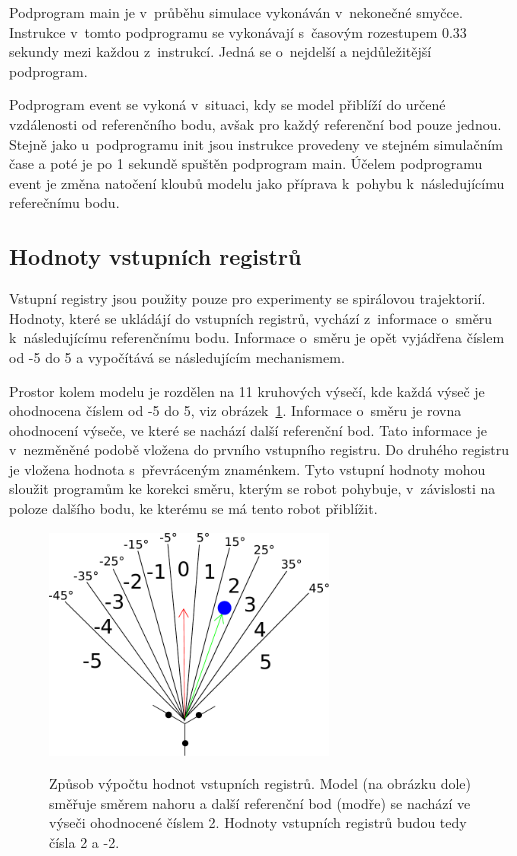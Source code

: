 Podprogram main je v~průběhu simulace vykonáván v~nekonečné smyčce.
Instrukce v~tomto podprogramu se vykonávají s~časovým rozestupem 0.33 sekundy mezi každou z~instrukcí.
Jedná se o~nejdelší a nejdůležitější podprogram.

Podprogram event se vykoná v~situaci, kdy se model přiblíží do určené vzdálenosti od referenčního bodu, avšak pro každý referenční bod pouze jednou.
Stejně jako u~podprogramu init jsou instrukce provedeny ve stejném simulačním čase a poté je po 1 sekundě spuštěn podprogram main.
Účelem podprogramu event je změna natočení kloubů modelu jako příprava k~pohybu k~následujícímu referečnímu bodu.

\subsection{Hodnoty vstupních registrů}
Vstupní registry jsou použity pouze pro experimenty se spirálovou trajektorií.
Hodnoty, které se ukládájí do vstupních registrů, vychází z~informace o~směru k~následujícímu referenčnímu bodu.
Informace o~směru je opět vyjádřena číslem od -5 do 5 a vypočítává se následujícím mechanismem.

Prostor kolem modelu je rozdělen na 11 kruhových výsečí, kde každá výseč je ohodnocena číslem od -5 do 5, viz obrázek~\ref{fig:kruhove_vysece}.
Informace o~směru je rovna ohodnocení výseče, ve které se nachází další referenční bod.
Tato informace je v~nezměněné podobě vložena do prvního vstupního registru.
Do druhého registru je vložena hodnota s~převráceným znaménkem.
Tyto vstupní hodnoty mohou sloužit programům ke korekci směru, kterým se robot pohybuje, v~závislosti na poloze dalšího bodu, ke kterému se má tento robot přiblížit.


\begin{figure}[h]
    \centering
    {\includegraphics[width=20em]{obrazky/reference_direction_angles.pdf}}
    \caption[Způsob výpočtu hodnot vstupních registrů]{
    Způsob výpočtu hodnot vstupních registrů.
    Model (na obrázku dole) směřuje směrem nahoru a další referenční bod (modře) se nachází ve výseči ohodnocené číslem 2.
    Hodnoty vstupních registrů budou tedy čísla 2 a -2.
    }
    \label{fig:kruhove_vysece}
\end{figure}

